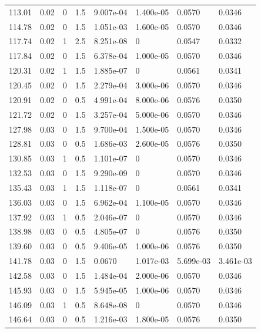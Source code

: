\documentclass[preview]{standalone}
\begin{document}
{{{\begin{tabular}{L{1.2cm}C{1.2cm} C{0.3cm}C{0.5cm} C{1.4cm}C{1.4cm} C{1.4cm}C{1.4cm}}
  113.01  &  0.02  & 0     & 1.5 &  9.007e-04  & 1.400e-05  & 0.0570 &  0.0346   \\ 
  114.78  &  0.02  & 0     & 1.5 &  1.051e-03  & 1.600e-05  & 0.0570 &  0.0346   \\ 
  117.74  &  0.02  & 1     & 2.5 &  8.251e-08  & 0  & 0.0547 &  0.0332   \\ 
  117.84  &  0.02  & 0     & 1.5 &  6.378e-04  & 1.000e-05  & 0.0570 &  0.0346   \\ 
  120.31  &  0.02  & 1     & 1.5 &  1.885e-07  & 0  & 0.0561 &  0.0341   \\ 
  120.45  &  0.02  & 0     & 1.5 &  2.279e-04  & 3.000e-06  & 0.0570 &  0.0346   \\ 
  120.91  &  0.02  & 0     & 0.5 &  4.991e-04  & 8.000e-06  & 0.0576 &  0.0350   \\ 
  121.72  &  0.02  & 0     & 1.5 &  3.257e-04  & 5.000e-06  & 0.0570 &  0.0346   \\ 
  127.98  &  0.03  & 0     & 1.5 &  9.700e-04  & 1.500e-05  & 0.0570 &  0.0346   \\ 
  128.81  &  0.03  & 0     & 0.5 &  1.686e-03  & 2.600e-05  & 0.0576 &  0.0350   \\ 
  130.85  &  0.03  & 1     & 0.5 &  1.101e-07  & 0  & 0.0570 &  0.0346   \\ 
  132.53  &  0.03  & 0     & 1.5 &  9.290e-09  & 0  & 0.0570 &  0.0346   \\ 
  135.43  &  0.03  & 1     & 1.5 &  1.118e-07  & 0  & 0.0561 &  0.0341   \\ 
  136.03  &  0.03  & 0     & 1.5 &  6.962e-04  & 1.100e-05  & 0.0570 &  0.0346   \\ 
  137.92  &  0.03  & 1     & 0.5 &  2.046e-07  & 0  & 0.0570 &  0.0346   \\ 
  138.98  &  0.03  & 0     & 0.5 &  4.805e-07  & 0  & 0.0576 &  0.0350   \\ 
  139.60  &  0.03  & 0     & 0.5 &  9.406e-05  & 1.000e-06  & 0.0576 &  0.0350   \\ 
  141.78  &  0.03  & 0     & 1.5 &  0.0670  & 1.017e-03  & 5.699e-03 &  3.461e-03   \\ 
  142.58  &  0.03  & 0     & 1.5 &  1.484e-04  & 2.000e-06  & 0.0570 &  0.0346   \\ 
  145.93  &  0.03  & 0     & 1.5 &  5.945e-05  & 1.000e-06  & 0.0570 &  0.0346   \\ 
  146.09  &  0.03  & 1     & 0.5 &  8.648e-08  & 0  & 0.0570 &  0.0346   \\ 
  146.64  &  0.03  & 0     & 0.5 &  1.216e-03  & 1.800e-05  & 0.0576 &  0.0350   \\ 

\end{tabular}}}}
\end{document}
